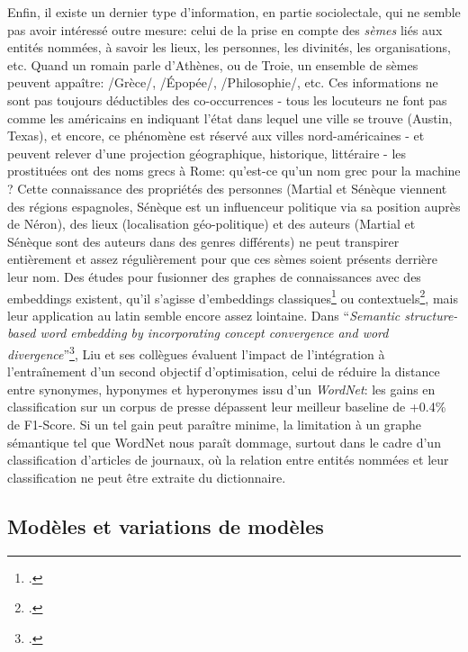 Enfin, il existe un dernier type d'information, en partie sociolectale, qui ne semble pas avoir intéressé outre mesure: celui de la prise en compte des \textit{sèmes} liés aux entités nommées, à savoir les lieux, les personnes, les divinités, les organisations, etc. Quand un romain parle d'Athènes, ou de Troie, un ensemble de sèmes peuvent appaître: /Grèce/, /Épopée/, /Philosophie/, etc. Ces informations ne sont pas toujours déductibles des co-occurrences - tous les locuteurs ne font pas comme les américains en indiquant l'état dans lequel une ville se trouve (Austin, Texas), et encore, ce phénomène est réservé aux villes nord-américaines - et peuvent relever d'une projection géographique, historique, littéraire - les prostituées ont des noms grecs à Rome: qu'est-ce qu'un nom grec pour la machine ? Cette connaissance des propriétés des personnes (Martial et Sénèque viennent des régions espagnoles, Sénèque est un influenceur politique via sa position auprès de Néron), des lieux (localisation géo-politique) et des auteurs (Martial et Sénèque sont des auteurs dans des genres différents) ne peut transpirer entièrement et assez régulièrement pour que ces sèmes soient présents derrière leur nom. Des études pour fusionner des graphes de connaissances avec des embeddings existent, qu'il s'agisse d'embeddings classiques\footcite{wang_knowledge_2014} ou contextuels\footcite{zhang_ernie_2019}, mais leur application au latin semble encore assez lointaine. Dans \enquote{\textit{Semantic structure-based word embedding by incorporating concept convergence and word divergence}}\footcite{liu_semantic_2018}, Liu et ses collègues évaluent l'impact de l'intégration à l'entraînement d'un second objectif d'optimisation, celui de réduire la distance entre synonymes, hyponymes et hyperonymes issu d'un \textit{WordNet}: les gains en classification sur un corpus de presse dépassent leur meilleur baseline de +0.4\% de F1-Score. Si un tel gain peut paraître minime, la limitation à un graphe sémantique tel que WordNet nous paraît dommage, surtout dans le cadre d'un classification d'articles de journaux, où la relation entre entités nommées et leur classification ne peut être extraite du dictionnaire.


\subsection{Modèles et variations de modèles}

